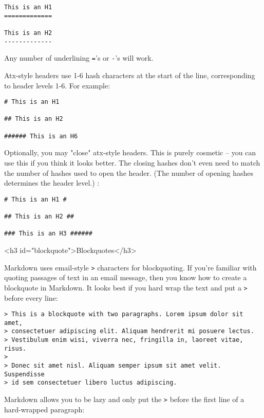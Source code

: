 \begin{lstlisting}
This is an H1
=============

This is an H2
-------------
\end{lstlisting}




Any number of underlining \texttt{=}'s or \texttt{-}'s will work.



Atx-style headers use 1-6 hash characters at the start of the line,
corresponding to header levels 1-6. For example:

\begin{lstlisting}
# This is an H1

## This is an H2

###### This is an H6
\end{lstlisting}




Optionally, you may "close" atx-style headers. This is purely
cosmetic -- you can use this if you think it looks better. The
closing hashes don't even need to match the number of hashes
used to open the header. (The number of opening hashes
determines the header level.) :

\begin{lstlisting}
# This is an H1 #

## This is an H2 ##

### This is an H3 ######
\end{lstlisting}


<h3 id="blockquote">Blockquotes</h3>



Markdown uses email-style \texttt{>} characters for blockquoting. If you're
familiar with quoting passages of text in an email message, then you
know how to create a blockquote in Markdown. It looks best if you hard
wrap the text and put a \texttt{>} before every line:

\begin{lstlisting}
> This is a blockquote with two paragraphs. Lorem ipsum dolor sit amet,
> consectetuer adipiscing elit. Aliquam hendrerit mi posuere lectus.
> Vestibulum enim wisi, viverra nec, fringilla in, laoreet vitae, risus.
> 
> Donec sit amet nisl. Aliquam semper ipsum sit amet velit. Suspendisse
> id sem consectetuer libero luctus adipiscing.
\end{lstlisting}




Markdown allows you to be lazy and only put the \texttt{>} before the first
line of a hard-wrapped paragraph:

